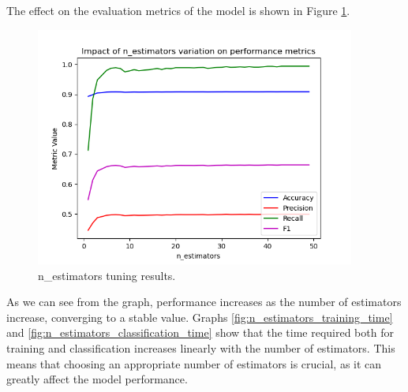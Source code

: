 \documentclass[futureinternet,article,submit,pdftex,moreauthors]{Definitions/mdpi}
\begin{document}
The effect on the evaluation metrics of the model is shown in Figure \ref{fig:n_estimators_tuning}.

\begin{figure}[H]
	\centering
	\includegraphics[width=10.5cm]{img/nEstimatorsTuning.png}
	\caption{n\_estimators tuning results.}\label{fig:n_estimators_tuning}
\end{figure}
\unskip

As we can see from the graph, performance increases as the number of estimators increase, converging to a stable value. 
Graphs \ref{fig:n_estimators_training_time} and \ref{fig:n_estimators_classification_time} show that the time required both for training and classification increases linearly with the number of estimators.
This means that choosing an appropriate number of estimators is crucial, as it can greatly affect the model performance. 
\end{document}

